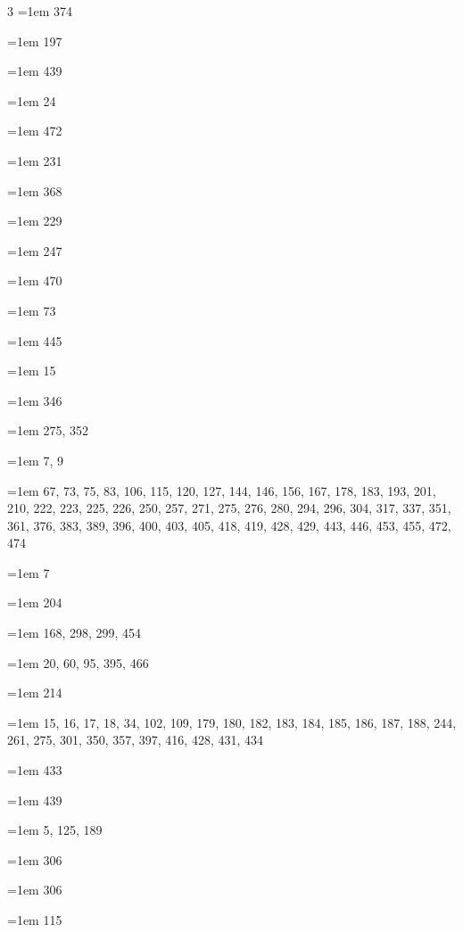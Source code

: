 \begin{multicols}{3}
\hangindent=1em  374\par
\hangindent=1em  197\par
\hangindent=1em  439\par
\hangindent=1em  24\par
\hangindent=1em  472\par
\hangindent=1em  231\par
\hangindent=1em  368\par
\hangindent=1em  229\par
\hangindent=1em  247\par
\hangindent=1em  470\par
\hangindent=1em  73\par
\hangindent=1em  445\par
\hangindent=1em  15\par
\hangindent=1em  346\par
\hangindent=1em  275, 352\par
\hangindent=1em  7, 9\par
\hangindent=1em  67, 73, 75, 83, 106, 115, 120, 127, 144, 146, 156, 167, 178, 183, 193, 201, 210, 222, 223, 225, 226, 250, 257, 271, 275, 276, 280, 294, 296, 304, 317, 337, 351, 361, 376, 383, 389, 396, 400, 403, 405, 418, 419, 428, 429, 443, 446, 453, 455, 472, 474\par
\hangindent=1em  7\par
\hangindent=1em  204\par
\hangindent=1em  168, 298, 299, 454\par
\hangindent=1em  20, 60, 95, 395, 466\par
\hangindent=1em  214\par
\hangindent=1em  15, 16, 17, 18, 34, 102, 109, 179, 180, 182, 183, 184, 185, 186, 187, 188, 244, 261, 275, 301, 350, 357, 397, 416, 428, 431, 434\par
\hangindent=1em  433\par
\hangindent=1em  439\par
\hangindent=1em  5, 125, 189\par
\hangindent=1em  306\par
\hangindent=1em  306\par
\hangindent=1em  115\par

\end{multicols}
